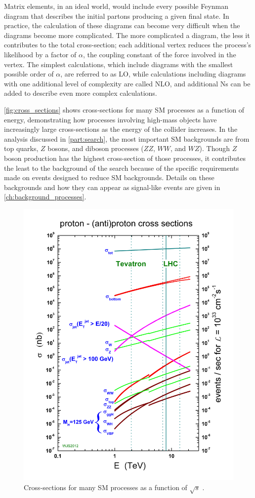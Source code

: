 Matrix elements, in an ideal world, would include every possible Feynman diagram that describes the initial partons producing a given final state. In practice, the calculation of these diagrams can become very difficult when the diagrams become more complicated. The more complicated a diagram, the less it contributes to the total cross-section; each additional vertex reduces the process's likelihood by a factor of $\alpha$, the coupling constant of the force involved in the vertex. The simplest calculations, which include diagrams with the smallest possible order of $\alpha$, are referred to as \ac{LO}, while calculations including diagrams with one additional level of complexity are called \ac{NLO}, and additional Ns can be added to describe even more complex calculations.

\autoref{fig:cross_sections} shows cross-sections for many \ac{SM} processes as a function of energy, demonstrating how processes involving high-mass objects have increasingly large cross-sections as the energy of the collider increases. In the analysis discussed in \autoref{part:search}, the most important \ac{SM} backgrounds are from top quarks, $Z$ bosons, and diboson processes ($ZZ$, $WW$, and $WZ$). Though $Z$ boson production has the highest cross-section of those processes, it contributes the least to the background of the search because of the specific requirements made on events designed to reduce \ac{SM} backgrounds. Details on these backgrounds and how they can appear as signal-like events are given in \autoref{ch:background_processes}. 

\begin{centering}
\begin{figure}[!hbt]
\myfloatalign
\includegraphics[width=.75\linewidth]{figures/lhc/crosssections2013.jpg}
\caption{Cross-sections for many \ac{SM} processes as a function of $\sqrt{s}$ \cite{crosssections}.}
\label{fig:cross_sections}
\end{figure}
\end{centering}


